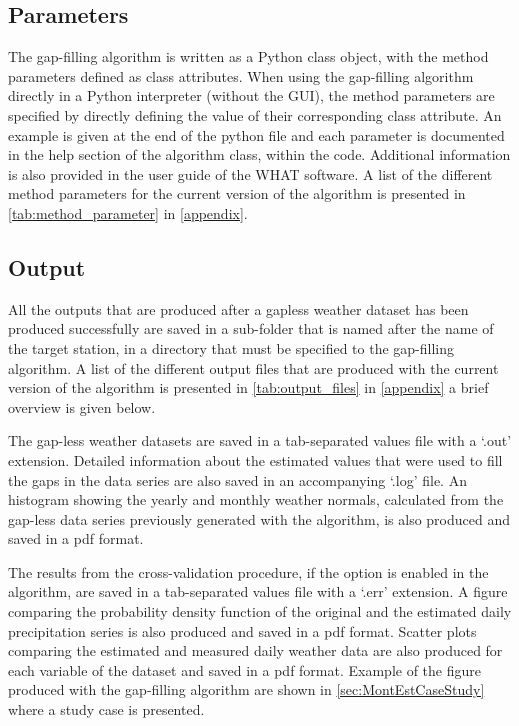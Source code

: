\documentclass[TechnicalNoteMeteo.tex]{subfiles}
\begin{document}
\subsection{Parameters}\label{sec:parameters}

The gap-filling algorithm is written as a Python class object, with the method parameters defined as class attributes. When using the gap-filling algorithm directly in a Python interpreter (without the GUI), the method parameters are specified by directly defining the value of their corresponding class attribute. An example is given at the end of the python file and each parameter is documented in the help section of the algorithm class, within the code. Additional information is also provided in the user guide of the WHAT software. A list of the different method parameters for the current version of the algorithm is presented in \cref{tab:method_parameter} in \ref{appendix}.

\subsection{Output}\label{sec:output}

All the outputs that are produced after a gapless weather dataset has been produced successfully are saved in a sub-folder that is named after the name of the target station, in a directory that must be specified to the gap-filling algorithm. A list of the different output files that are produced with the current version of the algorithm is presented in \cref{tab:output_files} in \ref{appendix} a brief overview is given below.

The gap-less weather datasets are saved in a tab-separated values file with a `.out' extension. Detailed information about the estimated values that were used to fill the gaps in the data series are also saved in an accompanying `.log' file. An histogram showing the yearly and monthly weather normals, calculated from the gap-less data series previously generated with the algorithm, is also produced and saved in a pdf format. 

The results from the cross-validation procedure, if the option is enabled in the algorithm, are saved in a tab-separated values file with a `.err' extension. A figure comparing the probability density function of the original and the estimated daily precipitation series is also produced and saved in a pdf format. Scatter plots comparing the estimated and measured daily weather data are also produced for each variable of the dataset and saved in a pdf format. Example of the figure produced with the gap-filling algorithm are shown in \cref{sec:MontEstCaseStudy} where a study case is presented.
\end{document}
